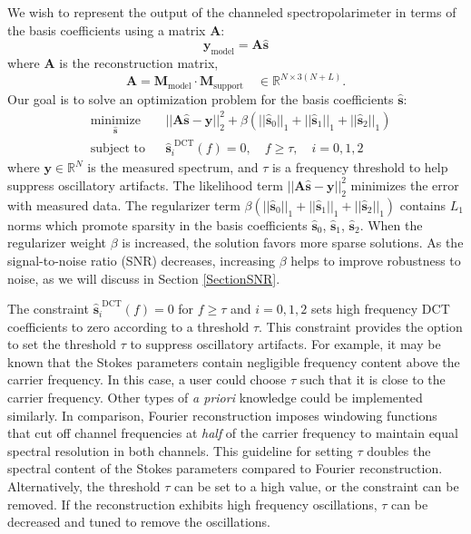 \documentclass[10pt]{article}
\numberwithin{equation}{subsection}
\newcommand{\lbf}[1]{\ensuremath{{\boldsymbol #1}}}
\begin{document}
We wish to represent the output of the channeled spectropolarimeter in terms of the basis coefficients using a matrix $\lbf A$:
    \begin{equation}
        \lbf y_{\text{model}} = \lbf A \widehat{\lbf s}
    \end{equation}
where $\lbf A$ is the reconstruction matrix,
    \begin{equation}
        \lbf A = \lbf M_{\text{model}} \cdot \lbf M_{\text{support}} \quad \in \mathbb R^{N \times 3(N + L)}.
    \end{equation}
Our goal is to solve an optimization problem for the basis coefficients $\widehat{\lbf s}$:
    \begin{equation}
        \begin{aligned}
            & \underset{\widehat{\lbf s}}{\text{minimize}}
            & & || \lbf A \widehat{\lbf s} - \lbf y ||^2_2 + \beta \left(|| \widehat{\lbf s}_0 ||_1 + || \widehat{\lbf s}_1 ||_1 + || \widehat{\lbf s}_2 ||_1\right)\\
            & \text{subject to}
            & & \widehat{\lbf s}_i^{\text{ DCT}}(f) = 0, \quad f \geq \tau, \quad i = 0, 1, 2
        \end{aligned}
        \label{MinimizationProblem}
    \end{equation}
where $\lbf y \in \mathbb R^N$ is the measured spectrum, and $\tau$ is a frequency threshold to help suppress oscillatory artifacts.
The likelihood term $|| \lbf A \widehat{\lbf s} - \lbf y ||^2_2$ minimizes the error with measured data.
The regularizer term $\beta \left(|| \widehat{\lbf s}_0 ||_1 + || \widehat{\lbf s}_1 ||_1 + || \widehat{\lbf s}_2 ||_1\right)$ contains $L_1$ norms which promote sparsity in the basis coefficients $\widehat{\lbf s}_0$, $\widehat{\lbf s}_1$, $\widehat{\lbf s}_2$.
When the regularizer weight $\beta$ is increased, the solution favors more sparse solutions.
As the signal-to-noise ratio (SNR) decreases, increasing $\beta$ helps to improve robustness to noise, as we will discuss in Section \ref{SectionSNR}.

The constraint $\widehat{\lbf s}_i^{\text{ DCT}}(f) = 0$ for $f \geq \tau$ and $i = 0, 1, 2$ sets high frequency DCT coefficients to zero according to a threshold $\tau$.
This constraint provides the option to set the threshold $\tau$ to suppress oscillatory artifacts.
For example, it may be known that the Stokes parameters contain negligible frequency content above the carrier frequency.
In this case, a user could choose $\tau$ such that it is close to the carrier frequency.
Other types of \emph{a priori} knowledge could be implemented similarly.
In comparison, Fourier reconstruction imposes windowing functions that cut off channel frequencies at \emph{half} of the carrier frequency to maintain equal spectral resolution in both channels.
This guideline for setting $\tau$ doubles the spectral content of the Stokes parameters compared to Fourier reconstruction.
Alternatively, the threshold $\tau$ can be set to a high value, or the constraint can be removed.
If the reconstruction exhibits high frequency oscillations, $\tau$ can be decreased and tuned to remove the oscillations.
\end{document}
